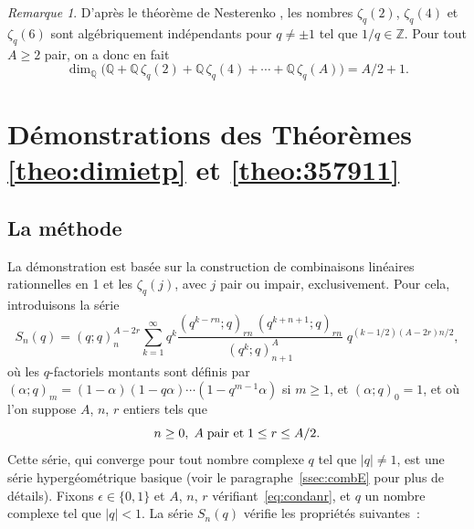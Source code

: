 \documentclass[12pt]{amsart}
\newcommand{\io}{\infty}
\newcommand{\ep}{\epsilon}
\theoremstyle{remark}
\newtheorem*{remark}{Remarque}
\numberwithin{equation}{section}
\begin{document}
\begin{remark} 
D'apr{\`e}s le th{\'e}or{\`e}me de Nesterenko \cite{ne3}, les nombres 
$\zeta_q(2)$, $\zeta_q(4)$ et 
$\zeta_q(6)$ sont alg{\'e}bri\-que\-ment ind{\'e}pendants pour 
$q\not =\pm1$ tel que $1/q\in\mathbb{Z}$. 
Pour tout $A\ge 2$ pair, on a donc en fait
$$
\dim_{\mathbb{Q}} \bigl(\mathbb{Q}+\mathbb{Q}\,
\zeta_q(2)+ 
\mathbb{Q} \,\zeta_q(4)+ \cdots +
\mathbb{Q} \,\zeta_q(A)\bigr)= A/2+1.
$$
\end{remark}

\section{D{\'e}monstrations des Th{\'e}or{\`e}mes \ref{theo:dimietp} et 
\ref{theo:357911}}
\label{sec:demodimietp}
\subsection{La m{\'e}thode}\label{para:resume}
La d{\'e}monstration est bas{\'e}e sur la construction de combinaisons 
li\-n{\'e}\-aires rationnelles 
en 1 et les $\zeta_q(j)$, avec $j$ pair ou impair, exclusivement. 
Pour cela, introduisons  
la s{\'e}rie  
$$
S_n(q)
= (q;q)_n^{A-2r}
\sum_{k=1}^{\io}q^k 
\frac{(q^{k-rn};q)_{rn}\,(q^{k+n+1};q)_{rn}}{(q^k;q)_{n+1}^{A}}\;q^{(k-1/2)(A-2r)n/2},
$$
o{\`u} les $q$-factoriels
montants sont d{\'e}finis par $(\alpha;q)_m=(1-\alpha)(1-q\alpha)\cdots
(1-q^{m-1}\alpha)$ si $m\ge1$, et $(\alpha;q)_0=1$, et
o{\`u} l'on suppose $A$, $n$, $r$ entiers tels que 
\begin{equation}
n\ge 0,\; A \;\textup{pair et}\;  1\le r\le  A/2.
\label{eq:condanr}
\end{equation}
Cette s{\'e}rie, qui   
converge pour tout nombre complexe $q$ tel que $\vert q\vert \ne 1$, est 
une s{\'e}rie hyperg{\'e}om{\'e}trique 
basique (voir le paragraphe~\ref{ssec:combE} pour plus de d{\'e}tails).   
Fixons $\ep\in\{0,1\}$ et $A$, $n$, $r$ v{\'e}rifiant~\eqref{eq:condanr}, 
et $q$ un nombre complexe tel 
que $\vert q\vert <1$. La  s{\'e}rie $S_n(q)$ v{\'e}rifie les propri{\'e}t{\'e}s
suivantes~:
\end{document}
